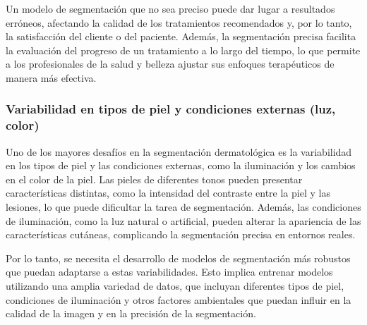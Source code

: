 Un modelo de segmentación que no sea preciso puede dar lugar a resultados erróneos, afectando la calidad de los tratamientos recomendados y, por lo tanto, la satisfacción del cliente o del paciente. Además, la segmentación precisa facilita la evaluación del progreso de un tratamiento a lo largo del tiempo, lo que permite a los profesionales de la salud y belleza ajustar sus enfoques terapéuticos de manera más efectiva. \parencite{chuchu2020}

\subsubsection{Variabilidad en tipos de piel y condiciones externas (luz, color)}
Uno de los mayores desafíos en la segmentación dermatológica es la variabilidad en los tipos de piel y las condiciones externas, como la iluminación y los cambios en el color de la piel. Las pieles de diferentes tonos pueden presentar características distintas, como la intensidad del contraste entre la piel y las lesiones, lo que puede dificultar la tarea de segmentación. Además, las condiciones de iluminación, como la luz natural o artificial, pueden alterar la apariencia de las características cutáneas, complicando la segmentación precisa en entornos reales.

Por lo tanto, se necesita el desarrollo de modelos de segmentación más robustos que puedan adaptarse a estas variabilidades. Esto implica entrenar modelos utilizando una amplia variedad de datos, que incluyan diferentes tipos de piel, condiciones de iluminación y otros factores ambientales que puedan influir en la calidad de la imagen y en la precisión de la segmentación. \parencite{zhao2021}



